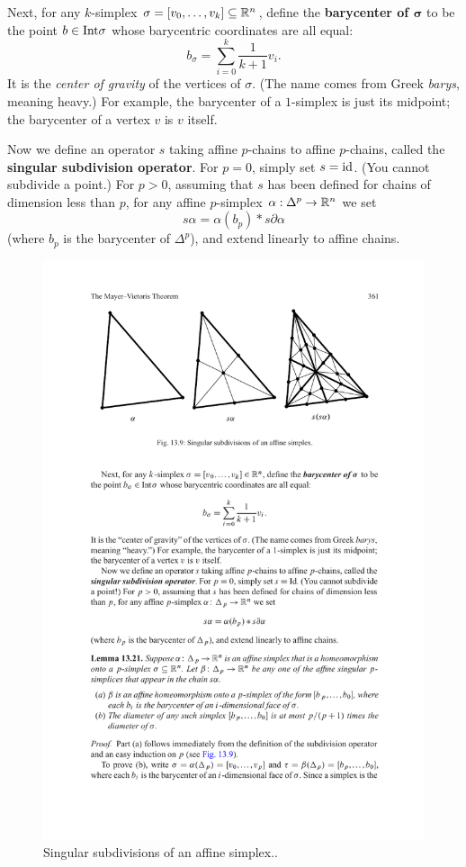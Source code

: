 Next, for any $k$-simplex $\sigma=[v_0,\dots,v_k]\subseteq\mathbb{R}^n$, define the \textbf{barycenter of $\bm{\sigma}$} to be the point $b\in\mathrm{Int}\sigma$ whose barycentric coordinates are all equal:
\[b_\sigma=\sum_{i=0}^{k}\dfrac{1}{k+1}v_i.\]
It is the \textit{center of gravity} of the vertices of $\sigma$. (The name comes from Greek \textit{barys}, meaning heavy.) For example, the barycenter of a $1$-simplex is just its midpoint; the barycenter of a vertex $v$ is $v$ itself.\par
Now we define an operator $s$ taking affine $p$-chains to affine $p$-chains, called the \textbf{singular subdivision operator}. For $p=0$, simply set $s=\mathrm{id}$. (You cannot subdivide a point.) For $p>0$, assuming that $s$ has been defined for chains of dimension less than $p$, for any affine $p$-simplex $\alpha:\Delta^p\to\mathbb{R}^n$ we set
\[s\alpha=\alpha(b_p)\ast s\partial\alpha\]
(where $b_p$ is the barycenter of $\Delta^p$), and extend linearly to affine chains.
\begin{figure}[htbp]
\centering
\includegraphics{barycenter-1}
\caption{Singular subdivisions of an affine simplex..}
\end{figure}
